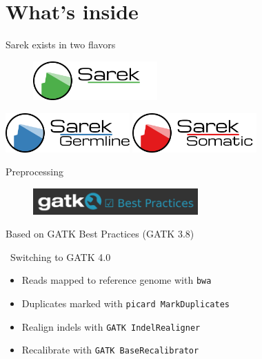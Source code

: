 \documentclass[usepdftitle=false]{beamer}
\begin{document}


\section{What's inside}

\begin{frame}{Sarek exists in two flavors}
	\begin{figure}
		\includegraphics[height=1.5cm]{pictures/Sarek}
	\end{figure}
	\vfill
	\pause
	\begin{center}
		\includegraphics[height=1.5cm]{pictures/Sarek_germline}
		\hfill
		\pause
		\includegraphics[height=1.5cm]{pictures/Sarek_somatic}
	\end{center}
	\end{frame}


\begin{frame}{Preprocessing}
	\begin{figure}
		\includegraphics[height=1cm]{pictures/GATKBP}
	\end{figure}
	Based on GATK Best Practices (GATK 3.8)

	\faWrench\ Switching to GATK 4.0
	\pause

	\begin{itemize}
		\item Reads mapped to reference genome with \texttt{bwa}
		\pause
		\item Duplicates marked with \texttt{picard MarkDuplicates}
		\pause
		\item Realign indels with \texttt{GATK IndelRealigner}
		\pause
		\item Recalibrate with \texttt{GATK BaseRecalibrator}
	\end{itemize}


\end{frame}
\end{document}
